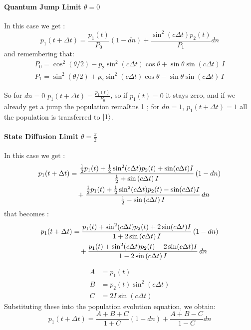 \documentclass[a4paper,12pt]{article}
\begin{document}
\paragraph{Quantum Jump Limit $ \theta =  0 $}
In this case we get : 
\begin{equation}
	p_1(t+\Delta t) = \frac{p_{1} \left(t\right)}{P_{0}} \left(1 - dn\right) + \frac{\sin^{2}(c\Delta t) p_{2} \left(t\right)}{P_{1}} dn
\end{equation} 
and remembering that:
\begin{gather*}
	P_{0} = \cos^{2}(\theta/2) - p_{2}\sin^{2}(c\Delta t)\cos\theta + \sin\theta\sin(c\Delta t)\, I \\
	P_{1} = \sin^{2}(\theta/2) + p_{2}\sin^{2}(c\Delta t)\cos\theta - \sin\theta\sin(c\Delta t)\, I
\end{gather*}

So for $ dn = 0 $ $ p_1(t+\Delta t) = \frac{p_{1} \left(t\right)}{P_{0}} $, so if $ p_{1} (t) = 0 $ it stays zero, and if we already get a jump the population rema0ins 1 ; for $ dn = 1 $, $ p_1(t+\Delta t) = 1 $ all the population is transferred to $ \ket{1} $.

\paragraph{State Diffusion Limit $ \theta = \frac{\pi}{2} $}
In this case we get : 
\begin{align}
	p_1(t+\Delta t) &= \frac{\frac{1}{2} p_1(t) + \frac{1}{2} \sin^{2}(c\Delta t) p_2(t) + \sin(c\Delta t)I}{ \frac{1}{2} + \sin \left( c \Delta t \right) I } \, (1-dn) \notag \\
	&\quad + \frac{ \frac{1}{2} p_1(t) + \frac{1}{2} \sin^{2}(c\Delta t)p_2(t) - \sin(c\Delta t)I}{\frac{1}{2} - \sin \left( c \Delta t \right) I} \, dn
\end{align} 
that becomes : 
\begin{align}
	p_1(t+\Delta t) &= \frac{ p_1(t) +  \sin^{2}(c\Delta t) p_2(t) + 2 \sin(c\Delta t)I}{ 1 + 2 \sin \left( c \Delta t \right) I } \, (1-dn) \notag \\
	&\quad + \frac{ p_1(t) + \sin^{2}(c\Delta t)p_2(t) - 2 \sin(c\Delta t)I}{1 - 2 \sin \left( c \Delta t \right) I} \, dn
\end{align} 

\begin{align}
	A &= p_1(t) \\
	B &= p_2(t) \sin^2(c\Delta t) \\
	C &= 2I \sin(c\Delta t)
\end{align}
Substituting these into the population evolution equation, we obtain:
\begin{equation}
	p_1(t+\Delta t) = \frac{A + B + C}{1 + C} (1 - dn) + \frac{A + B - C}{1 - C} dn
\end{equation}
\end{document}
